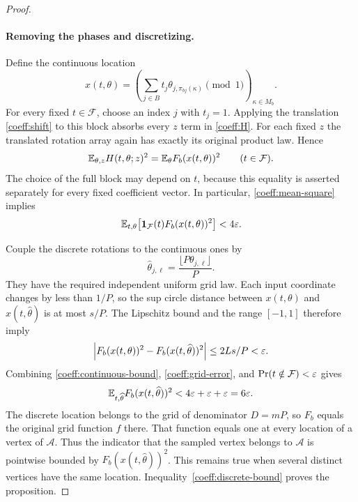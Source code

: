 \begin{proof}
\paragraph{Removing the phases and discretizing.}
Define the continuous location
\[
 x(t,\theta)
 =\left(\sum_{j\in B}t_j\theta_{j,\pi_{bj}(\kappa)}
          \pmod 1\right)_{\kappa\in M_b}.
\]
For every fixed $t\in\mathcal F$, choose an index $j$ with $t_j=1$.
Applying the translation \eqref{coeff:shift} to this block absorbs
every $z$ term in \eqref{coeff:H}.  For each fixed $z$ the translated
rotation array again has exactly its original product law.  Hence
\begin{equation}\label{coeff:absorption}
 \mathbb E_{\theta,z}H(t,\theta;z)^2
 =\mathbb E_\theta F_b(x(t,\theta))^2
 \qquad(t\in\mathcal F).
\end{equation}
The choice of the full block may depend on $t$, because this equality
is asserted separately for every fixed coefficient vector.  In
particular, \eqref{coeff:mean-square} implies
\begin{equation}\label{coeff:continuous-bound}
 \mathbb E_{t,\theta}\!\left[
 \mathbf 1_{\mathcal F}(t)F_b(x(t,\theta))^2\right]<4\varepsilon.
\end{equation}

Couple the discrete rotations to the continuous ones by
\[
 \widehat\theta_{j,\ell}
 =\frac{\lfloor P\theta_{j,\ell}\rfloor}{P}.
\]
They have the required independent uniform grid law.  Each input
coordinate changes by less than $1/P$, so the sup circle distance
between $x(t,\theta)$ and $x(t,\widehat\theta)$ is at most $s/P$.
The Lipschitz bound and the range $[-1,1]$ therefore imply
\begin{equation}\label{coeff:grid-error}
 \left|F_b(x(t,\theta))^2
       -F_b(x(t,\widehat\theta))^2\right|
 \le 2Ls/P<\varepsilon.
\end{equation}
Combining \eqref{coeff:continuous-bound},
\eqref{coeff:grid-error}, and $\Pr(t\notin\mathcal F)<\varepsilon$ gives
\begin{equation}\label{coeff:discrete-bound}
 \mathbb E_{t,\widehat\theta}
       F_b(x(t,\widehat\theta))^2
 <4\varepsilon+\varepsilon+\varepsilon=6\varepsilon.
\end{equation}
The discrete location belongs to the grid of denominator $D=mP$, so
$F_b$ equals the original grid function $f$ there.  That function
equals one at every location of a vertex of $\mathcal A$.
Thus the indicator that the sampled vertex belongs to $\mathcal A$
is pointwise bounded by $F_b(x(t,\widehat\theta))^2$.
This remains true when several distinct vertices have the same
location.  Inequality~\eqref{coeff:discrete-bound} proves the
proposition.
\end{proof}
